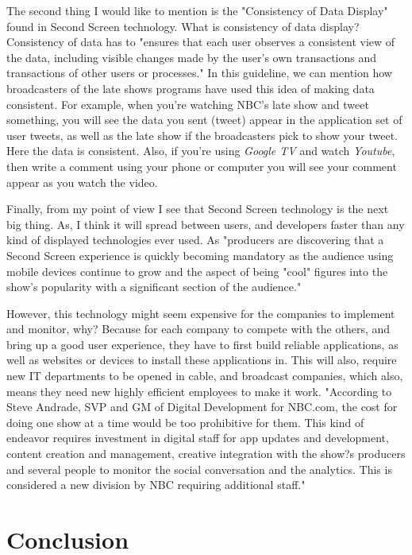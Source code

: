 \documentclass[12pt, oneside]{amsart}   	%
\begin{document}
 The second thing I would like to mention is the "Consistency of Data Display" found in Second Screen technology.  What is consistency of data display?   Consistency of data has to "ensures that each user observes a consistent view of the data, including visible changes made by the user's own transactions and transactions of other users or processes."\cite{guidline2} In this guideline, we can mention how broadcasters of the late shows programs have used this idea of making data consistent.  For example, when you're watching NBC's late show and tweet something, you will see the data you sent (tweet) appear in the application set of user tweets, as well as the late show if the broadcasters pick to show your tweet.  Here the data is consistent.  Also, if you're using  \emph{Google TV} and watch  \emph{Youtube}, then write a comment using your phone or computer you will see your comment appear as you watch the video.


Finally, from my point of view I see that Second Screen technology is the next big thing.  As, I think it will spread between users, and developers faster than any kind of displayed technologies ever used. As "producers are discovering that a Second Screen experience is quickly becoming mandatory as the audience using mobile devices continue to grow and the aspect of being "cool" figures into the show's popularity with a significant section of the audience."\cite{Second-Screen-Art}

 However, this technology might seem expensive for the companies to implement and monitor, why?  Because for each company to compete with the others, and bring up a good user experience, they have to first build reliable applications, as well as websites or devices to install these applications in.  This will also, require new IT departments to be opened in cable, and broadcast companies, which also, means they need new highly efficient employees to make it work.  "According to Steve Andrade, SVP and GM of Digital Development for NBC.com, the cost for doing one show at a time would be too prohibitive for them. This kind of endeavor requires investment in digital staff for app updates and development, content creation and management, creative integration with the show?s producers and several people to monitor the social conversation and the analytics. This is considered a new division by NBC requiring additional staff." \cite{Second-Screen-Art}

 \section{Conclusion}
\end{document}
